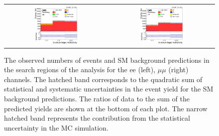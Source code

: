 \begin{figure}[ht]
  \begin{center}
    \begin{tabular}{cc}
      \includegraphics[width=0.45\textwidth]{figures/tW/fig/Result/ee/H_Limit_N_jet_bjet.png}&
      \includegraphics[width=0.45\textwidth]{figures/tW/fig/Result/mumu/H_Limit_N_jet_bjet.png}\\
    \end{tabular}
    \caption{The observed numbers of events and SM background predictions in the search regions of the analysis for the ee (left), $\mu\mu$ (right) channels. The hatched band corresponds to the quadratic sum of statistical and systematic uncertainties in the event yield for the SM background predictions. The ratios of data to the sum of the predicted yields are shown at the bottom of each plot. The narrow hatched band represents the contribution from the statistical uncertainty in the MC simulation.
    \label{fig:binee}}
  \end{center}
\end{figure}



\clearpage







